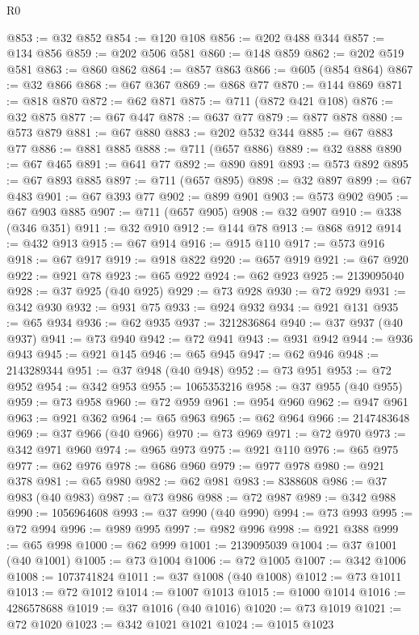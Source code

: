 \begin{lexlean}{R0}
\begin{coremodule}
@853 := @32 @852
@854 := @120 @108
@856 := @202 @488 @344
@857 := @134 @856
@859 := @202 @506 @581
@860 := @148 @859
@862 := @202 @519 @581
@863 := @860 @862
@864 := @857 @863
@866 := @605 (@854 @864)
@867 := @32 @866
@868 := @67 @367
@869 := @868 @77
@870 := @144 @869
@871 := @818 @870
@872 := @62 @871
@875 := @711 (@872 @421 @108)
@876 := @32 @875
@877 := @67 @447
@878 := @637 @77
@879 := @877 @878
@880 := @573 @879
@881 := @67 @880
@883 := @202 @532 @344
@885 := @67 @883 @77
@886 := @881 @885
@888 := @711 (@657 @886)
@889 := @32 @888
@890 := @67 @465
@891 := @641 @77
@892 := @890 @891
@893 := @573 @892
@895 := @67 @893 @885
@897 := @711 (@657 @895)
@898 := @32 @897
@899 := @67 @483
@901 := @67 @393 @77
@902 := @899 @901
@903 := @573 @902
@905 := @67 @903 @885
@907 := @711 (@657 @905)
@908 := @32 @907
@910 := @338 (@346 @351)
@911 := @32 @910
@912 := @144 @78
@913 := @868 @912
@914 := @432 @913
@915 := @67 @914
@916 := @915 @110
@917 := @573 @916
@918 := @67 @917
@919 := @918 @822
@920 := @657 @919
@921 := @67 @920
@922 := @921 @78
@923 := @65 @922
@924 := @62 @923
@925 := 2139095040
@928 := @37 @925 (@40 @925)
@929 := @73 @928
@930 := @72 @929
@931 := @342 @930
@932 := @931 @75
@933 := @924 @932
@934 := @921 @131
@935 := @65 @934
@936 := @62 @935
@937 := 3212836864
@940 := @37 @937 (@40 @937)
@941 := @73 @940
@942 := @72 @941
@943 := @931 @942
@944 := @936 @943
@945 := @921 @145
@946 := @65 @945
@947 := @62 @946
@948 := 2143289344
@951 := @37 @948 (@40 @948)
@952 := @73 @951
@953 := @72 @952
@954 := @342 @953
@955 := 1065353216
@958 := @37 @955 (@40 @955)
@959 := @73 @958
@960 := @72 @959
@961 := @954 @960
@962 := @947 @961
@963 := @921 @362
@964 := @65 @963
@965 := @62 @964
@966 := 2147483648
@969 := @37 @966 (@40 @966)
@970 := @73 @969
@971 := @72 @970
@973 := @342 @971 @960
@974 := @965 @973
@975 := @921 @110
@976 := @65 @975
@977 := @62 @976
@978 := @686 @960
@979 := @977 @978
@980 := @921 @378
@981 := @65 @980
@982 := @62 @981
@983 := 8388608
@986 := @37 @983 (@40 @983)
@987 := @73 @986
@988 := @72 @987
@989 := @342 @988
@990 := 1056964608
@993 := @37 @990 (@40 @990)
@994 := @73 @993
@995 := @72 @994
@996 := @989 @995
@997 := @982 @996
@998 := @921 @388
@999 := @65 @998
@1000 := @62 @999
@1001 := 2139095039
@1004 := @37 @1001 (@40 @1001)
@1005 := @73 @1004
@1006 := @72 @1005
@1007 := @342 @1006
@1008 := 1073741824
@1011 := @37 @1008 (@40 @1008)
@1012 := @73 @1011
@1013 := @72 @1012
@1014 := @1007 @1013
@1015 := @1000 @1014
@1016 := 4286578688
@1019 := @37 @1016 (@40 @1016)
@1020 := @73 @1019
@1021 := @72 @1020
@1023 := @342 @1021 @1021
@1024 := @1015 @1023

\end{coremodule}
\end{lexlean}
